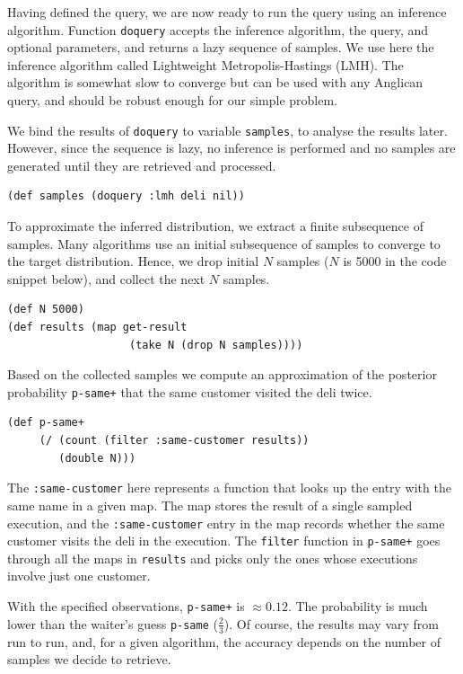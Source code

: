 \documentclass[preprint]{sigplanconf}
\begin{document}
Having defined the query, we are now ready to run the query
using an inference algorithm. Function
\texttt{doquery}\iftoggle{full}{ provided
by the \texttt{anglican.core} namespace}{} accepts the inference
algorithm, the query, and optional parameters, and returns a
lazy sequence of samples. We use here the inference algorithm
called Lightweight Metropolis-Hastings (LMH). The algorithm is
somewhat slow to converge but can be used with any Anglican
query, and should be robust enough for our simple problem.

We bind the results of \texttt{doquery} to variable
\texttt{samples}, to analyse the results later. However, since
the sequence is lazy, no inference is performed and no samples
are generated until they are retrieved and processed.

\begin{lstlisting}[style=default]
(def samples (doquery :lmh deli nil))
\end{lstlisting}

To approximate the inferred distribution, we extract a finite
subsequence of samples. Many algorithms use an initial
subsequence of samples to converge to the target distribution.
Hence, we drop initial $N$ samples ($N$ is 5000 in the code
snippet below), and collect the next $N$ samples.

\begin{lstlisting}[style=default]
(def N 5000)
(def results (map get-result
                   (take N (drop N samples))))
\end{lstlisting}

Based on the collected samples we compute an approximation of
the posterior probability \texttt{p-same+} that the same
customer visited the deli twice.

\begin{lstlisting}[style=default]
(def p-same+ 
     (/ (count (filter :same-customer results))
        (double N)))
\end{lstlisting}
The \texttt{:same-customer} here represents a function
that looks up the entry with the same name in a given map.
The map stores the result of a single sampled execution,
and the \texttt{:same-customer} entry in the map
records whether the same customer visits the deli in the execution.
The \texttt{filter} function in \texttt{p-same+} 
goes through all the maps in \texttt{results}
and picks only the ones whose executions involve just one customer.

With the specified observations, \texttt{p-same+} is $\approx
0.12$. The probability is much lower than the
waiter's guess \texttt{p-same} ($\frac 2 3$).
Of course, the results may vary from run to run, and, for a given
algorithm, the accuracy depends on the number of samples we
decide to retrieve. 
\end{document}
